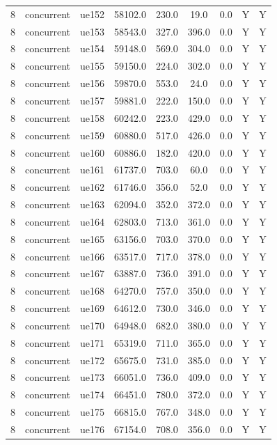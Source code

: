 \begin{table}[ht]
\begin{tabular}{|c|c|c|c|c|c|c|c|c|}
8 & concurrent & ue152 & 58102.0 & 230.0 & 19.0 & 0.0 & Y & Y \\
8 & concurrent & ue153 & 58543.0 & 327.0 & 396.0 & 0.0 & Y & Y \\
8 & concurrent & ue154 & 59148.0 & 569.0 & 304.0 & 0.0 & Y & Y \\
8 & concurrent & ue155 & 59150.0 & 224.0 & 302.0 & 0.0 & Y & Y \\
8 & concurrent & ue156 & 59870.0 & 553.0 & 24.0 & 0.0 & Y & Y \\
8 & concurrent & ue157 & 59881.0 & 222.0 & 150.0 & 0.0 & Y & Y \\
8 & concurrent & ue158 & 60242.0 & 223.0 & 429.0 & 0.0 & Y & Y \\
8 & concurrent & ue159 & 60880.0 & 517.0 & 426.0 & 0.0 & Y & Y \\
8 & concurrent & ue160 & 60886.0 & 182.0 & 420.0 & 0.0 & Y & Y \\
8 & concurrent & ue161 & 61737.0 & 703.0 & 60.0 & 0.0 & Y & Y \\
8 & concurrent & ue162 & 61746.0 & 356.0 & 52.0 & 0.0 & Y & Y \\
8 & concurrent & ue163 & 62094.0 & 352.0 & 372.0 & 0.0 & Y & Y \\
8 & concurrent & ue164 & 62803.0 & 713.0 & 361.0 & 0.0 & Y & Y \\
8 & concurrent & ue165 & 63156.0 & 703.0 & 370.0 & 0.0 & Y & Y \\
8 & concurrent & ue166 & 63517.0 & 717.0 & 378.0 & 0.0 & Y & Y \\
8 & concurrent & ue167 & 63887.0 & 736.0 & 391.0 & 0.0 & Y & Y \\
8 & concurrent & ue168 & 64270.0 & 757.0 & 350.0 & 0.0 & Y & Y \\
8 & concurrent & ue169 & 64612.0 & 730.0 & 346.0 & 0.0 & Y & Y \\
8 & concurrent & ue170 & 64948.0 & 682.0 & 380.0 & 0.0 & Y & Y \\
8 & concurrent & ue171 & 65319.0 & 711.0 & 365.0 & 0.0 & Y & Y \\
8 & concurrent & ue172 & 65675.0 & 731.0 & 385.0 & 0.0 & Y & Y \\
8 & concurrent & ue173 & 66051.0 & 736.0 & 409.0 & 0.0 & Y & Y \\
8 & concurrent & ue174 & 66451.0 & 780.0 & 372.0 & 0.0 & Y & Y \\
8 & concurrent & ue175 & 66815.0 & 767.0 & 348.0 & 0.0 & Y & Y \\
8 & concurrent & ue176 & 67154.0 & 708.0 & 356.0 & 0.0 & Y & Y \\

\end{tabular}
\end{table}
